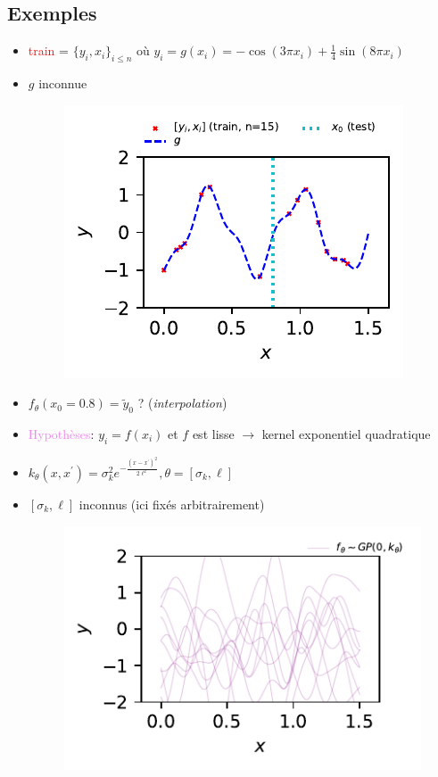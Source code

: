 \documentclass[xcolor=svgnames, t]{beamer}
\newcommand{\coloredemph}[1]{\textcolor{internationalblue}{\emph{#1}}}
\newcommand{\tored}[1]{\textcolor{red}{#1}}
\newcommand{\topurple}[1]{\textcolor{violet}{#1}}
\begin{document}
\subsection{Exemples}
\begin{frame}{\subsecname}
  \begin{itemize}
    \item\tored{train} = $\{y_i, x_i\}_{i \leq n}$ où $y_i = g(x_i) = - \cos(3 \pi x_i) + \frac{1}{4} \sin(8 \pi x_i)$
    \item $g$ inconnue
      \begin{figure}
        \includegraphics{gp_1D_example_noisefree_data.pdf}
      \end{figure}
    \item $f_\theta(x_0 = 0.8) = \tilde{y}_0$ ? (\coloredemph{interpolation})
  \end{itemize}
\end{frame}

\begin{frame}{\subsecname}
  \begin{itemize}
    \item<1-> \topurple{Hypothèses}: $y_i = f(x_i)$ et $f$ est lisse $\rightarrow$ kernel exponentiel quadratique
    \item $k_\theta (x, x^\prime) = \sigma_k^2 e^{- \frac{(x - x^\prime)^2}{2 \ell^2} }, \theta = [\sigma_k, \ell]$
    \item<2-> $[\sigma_k, \ell]$ inconnus (ici fixés arbitrairement)
      \begin{figure}
        \includegraphics{gp_1D_example_noisefree_data_prior.pdf}
      \end{figure}    
  \end{itemize}
\end{frame}
\end{document}
